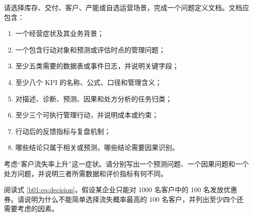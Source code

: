 \begin{exercise}
请选择库存、交付、客户、产能或自选运营场景，完成一个问题定义文档。文档应包含：
\begin{enumerate}
  \item 一个经营症状及其业务背景；
  \item 一个包含行动对象和预测或评估时点的管理问题；
  \item 至少五类需要的数据表或事件日志，并说明关键字段；
  \item 至少八个 KPI 的名称、公式、口径和管理含义；
  \item 对描述、诊断、预测、因果和处方分析的任务归类；
  \item 至少三个可执行管理行动，并说明成本或约束；
  \item 行动后的反馈指标与复盘机制；
  \item 哪些结论只属于相关或预测，哪些结论需要因果识别。
\end{enumerate}
\end{exercise}

\begin{exercise}
考虑“客户流失率上升”这一症状。请分别写出一个预测问题、一个因果问题和一个处方问题，并说明三者所需数据和评价指标有何不同。
\end{exercise}

\begin{exercise}
阅读式 \eqref{b01:eq:decision}。假设某企业只能对 1000 名客户中的 100 名发放优惠券。请说明为什么不能简单选择流失概率最高的 100 名客户，并列出至少四个还需要考虑的因素。
\end{exercise}
